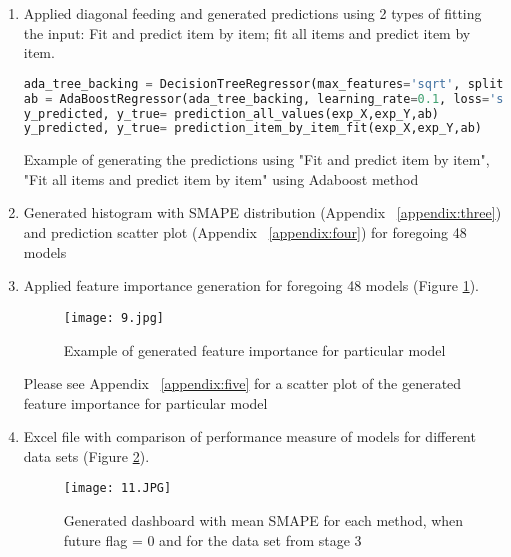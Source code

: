 \documentclass{article}
\begin{document}
\begin{enumerate}
\item Applied diagonal feeding and generated predictions using 2 types of fitting the input: Fit and predict item by item; fit all items and predict item by item.
\begin{lstlisting}[language =Python, breaklines=True]
ada_tree_backing = DecisionTreeRegressor(max_features='sqrt', splitter='random', min_samples_split=3, max_depth=3)
ab = AdaBoostRegressor(ada_tree_backing, learning_rate=0.1, loss='square', n_estimators=100)
y_predicted, y_true= prediction_all_values(exp_X,exp_Y,ab)
y_predicted, y_true= prediction_item_by_item_fit(exp_X,exp_Y,ab)
\end{lstlisting}
Example of generating the predictions using "Fit and predict item by item", "Fit all items and predict item by item" using Adaboost method

\item Generated histogram with SMAPE distribution (Appendix ~\ref{appendix:three}) and prediction scatter plot (Appendix ~\ref{appendix:four}) for foregoing 48 models

\item Applied feature importance generation for foregoing 48 models (Figure \ref{fig:one1}).

\begin{figure}[H]
\texttt{[image: 9.jpg]}
\centering
\caption{Example of generated feature importance for particular model}
\label{fig:one1}
\end{figure}

Please see Appendix ~\ref{appendix:five}  for a scatter plot of the generated feature importance for particular model


\item Excel file with comparison of performance measure of models for different data sets (Figure \ref{fig:excel_file_comparis}).

\begin{figure}[H]
\texttt{[image: 11.JPG]}
\centering
\caption{Generated dashboard with mean SMAPE for each method, when future flag = 0 and for the data set from stage 3}
\label{fig:excel_file_comparis}
\end{figure}

\end{enumerate}
\end{document}
